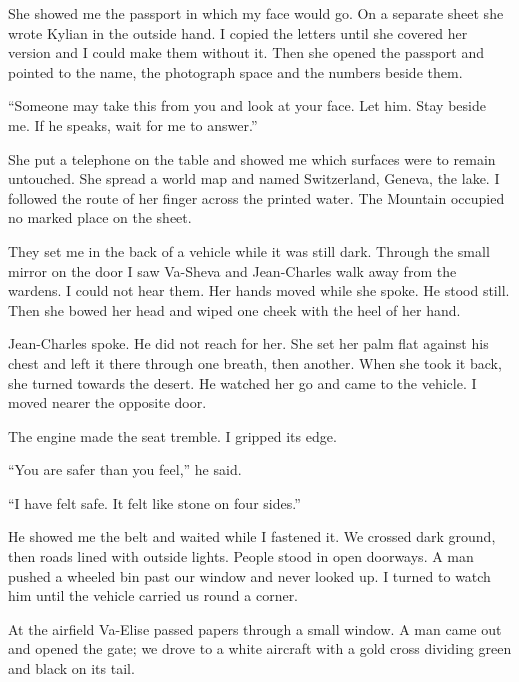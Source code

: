 She showed me the passport in which my face would go. On a separate sheet she wrote Kylian in the outside hand. I copied the letters until she covered her version and I could make them without it. Then she opened the passport and pointed to the name, the photograph space and the numbers beside them.\par

``Someone may take this from you and look at your face. Let him. Stay beside me. If he speaks, wait for me to answer.''\par

She put a telephone on the table and showed me which surfaces were to remain untouched. She spread a world map and named Switzerland, Geneva, the lake. I followed the route of her finger across the printed water. The Mountain occupied no marked place on the sheet.\par

They set me in the back of a vehicle while it was still dark. Through the small mirror on the door I saw Va-Sheva and Jean-Charles walk away from the wardens. I could not hear them. Her hands moved while she spoke. He stood still. Then she bowed her head and wiped one cheek with the heel of her hand.\par

Jean-Charles spoke. He did not reach for her. She set her palm flat against his chest and left it there through one breath, then another. When she took it back, she turned towards the desert. He watched her go and came to the vehicle. I moved nearer the opposite door.\par

The engine made the seat tremble. I gripped its edge.\par

``You are safer than you feel,'' he said.\par

``I have felt safe. It felt like stone on four sides.''\par

He showed me the belt and waited while I fastened it. We crossed dark ground, then roads lined with outside lights. People stood in open doorways. A man pushed a wheeled bin past our window and never looked up. I turned to watch him until the vehicle carried us round a corner.\par

At the airfield Va-Elise passed papers through a small window. A man came out and opened the gate; we drove to a white aircraft with a gold cross dividing green and black on its tail.\par

